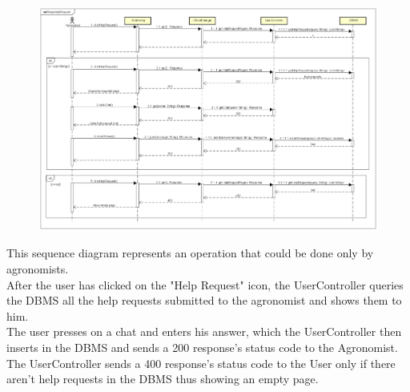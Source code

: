 \begin{figure}[H]
    \begin{center}
        \includegraphics[width=\textwidth]{Images/SequenceDiagrams/ReplyHelpRequestDD.png}
    \end{center}
\end{figure}

This sequence diagram represents an operation that could be done only by agronomists.\\
After the user has clicked on the "Help Request" icon, the UserController queries the DBMS 
all the help requests submitted to the agronomist and shows them to him.\\
The user presses on a chat and enters his answer, which the UserController then inserts 
in the DBMS and sends a 200 response's status code to the Agronomist.\\
The UserController sends a 400 response's status code to the User only 
if there aren't help requests in the DBMS thus showing an empty page.


\newpage

